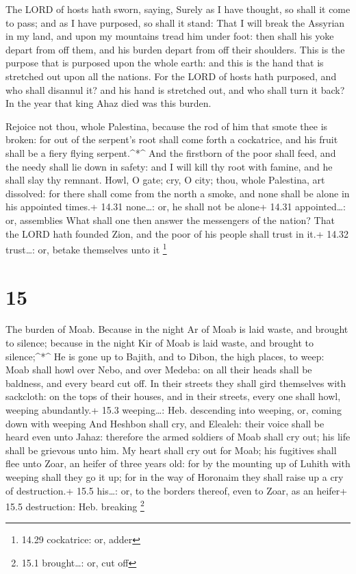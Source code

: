  The LORD of hosts hath sworn, saying, Surely as I have
thought, so shall it come to pass; and as I have purposed, so shall it
stand:  That I will break the Assyrian in my land, and upon
my mountains tread him under foot: then shall his yoke depart from off
them, and his burden depart from off their shoulders.  This
is the purpose that is purposed upon the whole earth: and this is the
hand that is stretched out upon all the nations.  For the
LORD of hosts hath purposed, and who shall disannul it? and his hand is
stretched out, and who shall turn it back?  In the year
that king Ahaz died was this burden.

 Rejoice not thou, whole Palestina, because the rod of him
that smote thee is broken: for out of the serpent's root shall come
forth a cockatrice, and his fruit shall be a fiery flying
serpent.\^{}*\^{}  And the firstborn of the poor shall
feed, and the needy shall lie down in safety: and I will kill thy root
with famine, and he shall slay thy remnant.  Howl, O gate;
cry, O city; thou, whole Palestina, art dissolved: for there shall come
from the north a smoke, and none shall be alone in his appointed times.+
14.31 none\ldots: or, he shall not be alone+ 14.31 appointed\ldots: or,
assemblies  What shall one then answer the messengers of
the nation? That the LORD hath founded Zion, and the poor of his people
shall trust in it.+ 14.32 trust\ldots: or, betake themselves unto it
\footnote{14.29 cockatrice: or, adder}

\hypertarget{section-14}{%
\section{15}\label{section-14}}

 The burden of Moab. Because in the night Ar of Moab is laid
waste, and brought to silence; because in the night Kir of Moab is laid
waste, and brought to silence;\^{}*\^{}  He is gone up to
Bajith, and to Dibon, the high places, to weep: Moab shall howl over
Nebo, and over Medeba: on all their heads shall be baldness, and every
beard cut off.  In their streets they shall gird themselves
with sackcloth: on the tops of their houses, and in their streets, every
one shall howl, weeping abundantly.+ 15.3 weeping\ldots: Heb. descending
into weeping, or, coming down with weeping  And Heshbon
shall cry, and Elealeh: their voice shall be heard even unto Jahaz:
therefore the armed soldiers of Moab shall cry out; his life shall be
grievous unto him.  My heart shall cry out for Moab; his
fugitives shall flee unto Zoar, an heifer of three years old: for by the
mounting up of Luhith with weeping shall they go it up; for in the way
of Horonaim they shall raise up a cry of destruction.+ 15.5 his\ldots:
or, to the borders thereof, even to Zoar, as an heifer+ 15.5
destruction: Heb. breaking \footnote{15.1 brought\ldots: or, cut off}

